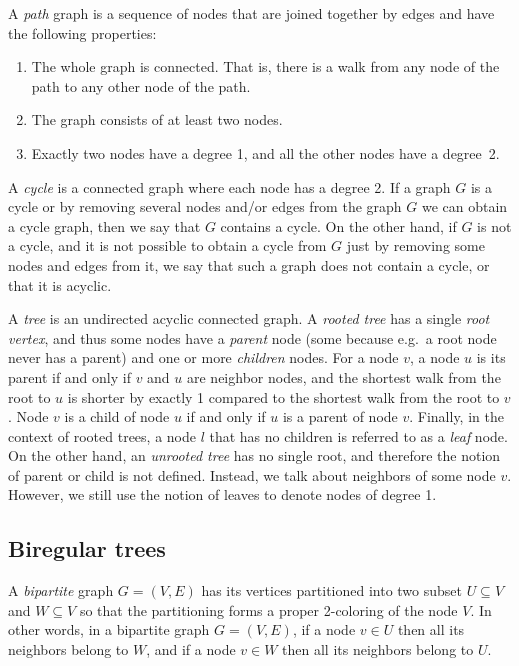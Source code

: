 A \emph{path} graph is a sequence of nodes that are joined together by edges and
have the following properties:

\begin{enumerate}
  \item The whole graph is connected. That is, there is a walk from any node of
  the path to any other node of the path.

  \item The graph consists of at least two nodes.

  \item Exactly two nodes have a degree 1, and all the other nodes have a degree~2.
\end{enumerate}

A \emph{cycle} is a connected graph where each node has a degree 2.
If a graph $G$ is a cycle or by removing several nodes and/or edges
from the graph $G$ we can obtain a cycle graph, then we say that
$G$ contains a cycle. On the other hand, if $G$ is not a cycle, and
it is not possible to obtain a cycle from $G$ just by removing some
nodes and edges from it, we say that such a graph does not contain a
cycle, or that it is acyclic.

A \emph{tree} is an undirected acyclic connected graph. A \emph{rooted tree}
has a single \emph{root vertex}, and thus some nodes have a \emph{parent} node
(some because e.g.\ a root node never has a parent) and one or more \emph{children}
nodes. For a node $v$, a node $u$ is its parent if and only if $v$ and $u$ are
neighbor nodes, and the shortest walk from the root to $u$ is shorter by exactly
1 compared to the shortest walk from the root to $v$. Node $v$ is a child of node
$u$ if and only if $u$ is a parent of node $v$. Finally, in the context of rooted trees,
a node $l$ that has no children is referred to as a \emph{leaf} node.
On the other hand, an \emph{unrooted tree} has no single root, and therefore the notion of parent
or child is not defined. Instead, we talk about neighbors of some node $v$. However, we 
still use the notion of leaves to denote nodes of degree 1.

\subsection{Biregular trees}
\label{subsection:biregular-trees}

A \emph{bipartite} graph $G = (V, E)$ has its vertices partitioned into two
subset $U \subseteq V$ and $W \subseteq V$ so that the partitioning forms
a proper 2-coloring of the node $V$. In other words, in a bipartite graph $G = (V, E)$,
if a node $v \in U$ then all its neighbors belong to $W$, and if a node $v \in W$
then all its neighbors belong to $U$.

